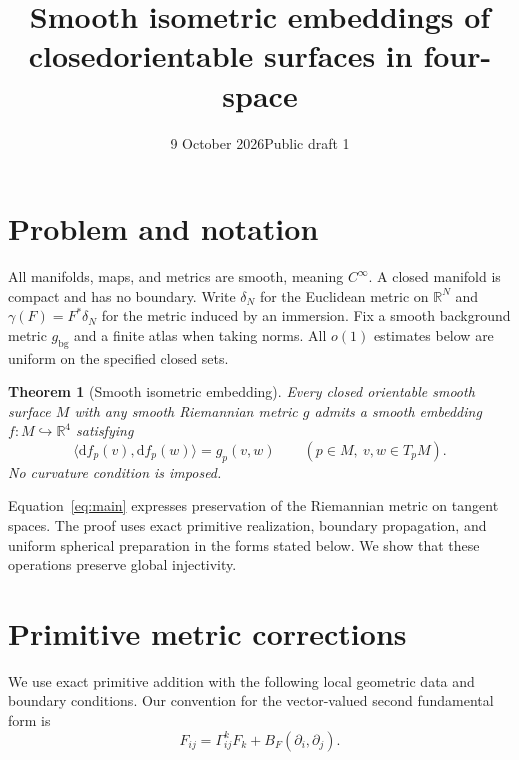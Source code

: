 \documentclass[11pt,a4paper]{article}
\title{\vspace{-1.3em}\LARGE\bfseries Smooth isometric embeddings of closed\newline orientable surfaces in four-space}
\author{}
\date{9 October 2026\quad\textbullet\quad Public draft 1}
\newcommand{\R}{\mathbb R}
\newcommand{\dd}{\mathrm d}
\newtheorem{theorem}{Theorem}[section]
\theoremstyle{definition}
\theoremstyle{remark}
\numberwithin{equation}{section}
\begin{document}
\maketitle
\thispagestyle{plain}

\section{Problem and notation}
\label{sec:statement}

All manifolds, maps, and metrics are smooth, meaning $C^\infty$.
A closed manifold is compact and has no boundary. Write $\delta_N$ for the
Euclidean metric on $\R^N$ and $\gamma(F)=F^*\delta_N$ for the metric induced
by an immersion. Fix a smooth background metric $g_{\mathrm{bg}}$ and a finite
atlas when taking norms. All $o(1)$ estimates below are uniform on the
specified closed sets.

\begin{theorem}[Smooth isometric embedding]
\label{thm:main}
Every closed orientable
smooth surface $M$ with any smooth Riemannian metric $g$ admits a smooth
embedding $f:M\hookrightarrow\R^4$ satisfying
\begin{equation}
 \langle \dd f_p(v),\dd f_p(w)\rangle=g_p(v,w)
 \qquad(p\in M,\ v,w\in T_pM).
 \label{eq:main}
\end{equation}
No curvature condition is imposed.
\end{theorem}

Equation~\eqref{eq:main} expresses preservation of the Riemannian metric
on tangent spaces. The proof uses exact primitive realization,
boundary propagation, and uniform spherical preparation in the forms
stated below. We show that these operations preserve global injectivity.

\section{Primitive metric corrections}
\label{sec:inputs}

We use exact primitive addition with the following local geometric data
and boundary conditions. Our convention for the vector-valued second
fundamental form is
\begin{equation}
 F_{ij}=\Gamma^k_{ij}F_k+B_F(\partial_i,\partial_j).
 \label{eq:gauss-decomposition}
\end{equation}
\end{document}
